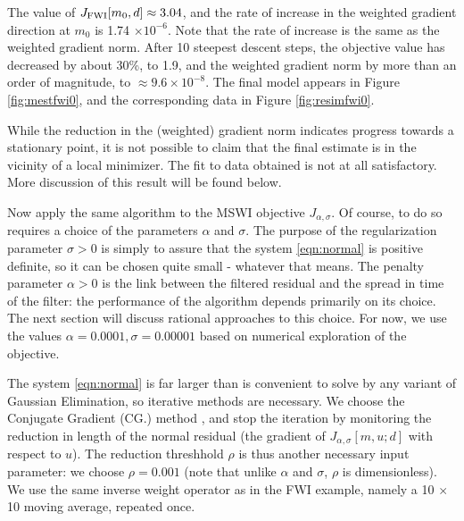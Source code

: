 The value of $J_{\rm FWI}[m_0,d] \approx 3.04$, and the rate of
increase in the weighted gradient direction at $m_0$ is 1.74 $\times
10^{-6}$. Note that the rate of increase is the same as the weighted
gradient norm. After 10 steepest descent steps, the objective value has
decreased by about 30\%, to 1.9, and the weighted gradient norm by
more than an order of magnitude, to $\approx 9.6 \times 10^{-8}$. The
final model appears in Figure \ref{fig:mestfwi0}, and the
corresponding data in Figure \ref{fig:resimfwi0}.




While the reduction in the (weighted) gradient norm indicates progress
towards a stationary point, it is not possible to claim that the final
estimate is in the vicinity of a local minimizer. The fit to data
obtained is not at all satisfactory. More discussion of this result
will be found below.

Now apply the same algorithm to the MSWI objective
$J_{\alpha,\sigma}$. Of course, to do so requires a choice of the
parameters $\alpha$ and $\sigma$. The purpose of the regularization
parameter $\sigma > 0$ is
simply to assure that the system \ref{eqn:normal} is positive
definite, so it can be chosen quite small - whatever that means. The
penalty parameter $\alpha > 0$ is the link between the filtered
residual and the spread in time of the filter: the performance of the
algorithm depends primarily on its choice. The next section will
discuss rational approaches to this choice. For now, we use the values
$\alpha=0.0001, \sigma=0.00001$ based on numerical exploration of the
objective.

The system \ref{eqn:normal} is far larger than is convenient to solve
by any variant of Gaussian Elimination, so iterative methods are 
necessary. We choose the Conjugate Gradient (CG.) method
\cite[]{Dan:67,Steihaug:83,NocedalWright}, and stop the
iteration by monitoring the reduction in length of the normal residual
(the gradient of $J_{\alpha,\sigma}[m,u;d]$ with respect to $u$). The
reduction threshhold $\rho$ is thus another necessary input parameter:
we choose $\rho = 0.001$ (note that unlike $\alpha$ and $\sigma$,
$\rho$ is dimensionless). We use the same inverse weight operator as
in the FWI example, namely a 10 $\times$ 10 moving average, repeated
once.

